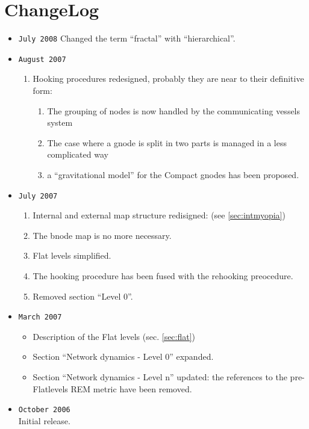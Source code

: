 \documentclass[a4paper]{article}
\begin{document}
\section{ChangeLog}
\begin{itemize}
	\item \verb|July 2008|
		Changed the term ``fractal'' with ``hierarchical''.
	\item \verb|August 2007|
		\begin{enumerate}
			\item Hooking procedures redesigned, probably they are
				near to their definitive form:
				\begin{enumerate}
					\item The grouping of nodes is now
						handled by the communicating
						vessels system
					\item The case where a gnode is
						split in two parts is managed
						in a less complicated way
					\item a ``gravitational model'' for
						the Compact gnodes has been
						proposed.
				\end{enumerate}
		\end{enumerate}
	\item \verb|July 2007|
		\begin{enumerate}
			\item Internal and external map structure redisigned:
				(see \ref{sec:intmyopia})
			\item The bnode map is no more necessary.
			\item Flat levels simplified.
			\item The hooking procedure has been fused with the
				rehooking preocedure.
			\item Removed section ``Level 0''.
		\end{enumerate}
	\item \verb|March 2007|
		\begin{itemize}
			\item Description of the Flat levels (sec. \ref{sec:flat})
			\item Section ``Network dynamics - Level 0'' expanded.
			\item Section ``Network
				dynamics - Level n'' updated: the references to
				the pre-Flatlevels REM metric have been
				removed.
		\end{itemize}
	\item \verb|October 2006|\\
		Initial release.
\end{itemize}
\end{document}
